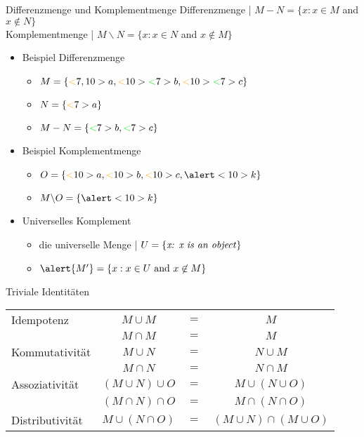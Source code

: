 \begin{frame}
  {Differenzmenge und Komplementmenge}
  \onslide<+->
  \onslide<+->
  Differenzmenge | \alert{$M-N=\{x: x\in M$ and $x\not\in N\}$}\\
  \onslide<+->
  Komplementmenge | \alert{$M\backslash N=\{x: x\in N$ and $x\not\in M\}$}\\
  \Halbzeile
  \begin{itemize}[<+->]
    \item Beispiel Differenzmenge
      \begin{itemize}[<+->]
        \item $M=\{\orongsch<7,10>{a},\orongsch<10>{\gruen<7>{b}},\orongsch<10>{\gruen<7>{c}}\}$
        \item $N=\{\orongsch<7>{a}\}$
        \item $M-N=\{\gruen<7>{b},\gruen<7>{c}\}$
      \end{itemize}
      \Halbzeile
    \item Beispiel Komplementmenge
      \begin{itemize}[<+->]
        \item $O=\{\orongsch<10>{a},\orongsch<10>{b},\orongsch<10>{c},\alert<10>{k}\}$
        \item $M\backslash O=\{\alert<10>{k}\}$
      \end{itemize}
      \Halbzeile
    \item Universelles Komplement
      \begin{itemize}[<+->]
        \item die universelle Menge | $U=\{\text{\textit{x: x is an object}}\}$
        \item $\alert{M^{\prime}}=\{x: x\in U\text{ and }x\not\in M\}$
      \end{itemize}
  \end{itemize}
\end{frame}

\begin{frame}
  {Triviale Identitäten}
  \onslide<+->
  \onslide<+->
  \centering 
  \begin{tabular}[h]{lccc}
    Idempotenz      & $M\cup M$         & $=$ & $M$ \\
                    & $M\cap M$         & $=$ & $M$ \\
   Kommutativität   & $M\cup N$         & $=$ & $N\cup M$ \\
                    & $M\cap N$         & $=$ & $N\cap M$ \\
   Assoziativität   & $(M\cup N)\cup O$ & $=$ & $M\cup (N\cup O)$ \\
                    & $(M\cap N)\cap O$ & $=$ & $M\cap (N\cap O)$ \\
   Distributivität  & $M\cup (N\cap O)$ & $=$ & $(M\cup N)\cap (M\cup O)$ \\
  \end{tabular}
\end{frame}


